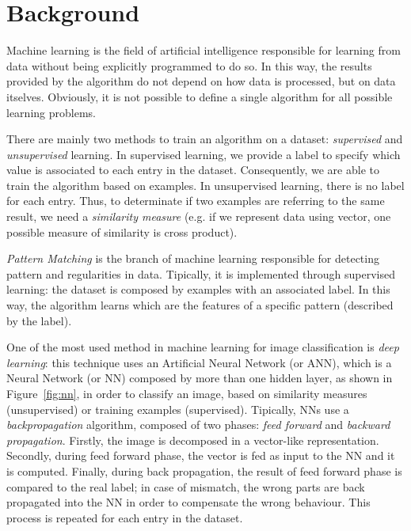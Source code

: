 \section{Background}
\label{sec:background}

Machine learning is the field of artificial intelligence responsible for learning from data without being explicitly programmed to do so. In this way, the results provided by the algorithm do not depend on how data is processed, but on data itselves. Obviously, it is not possible to define a single algorithm for all possible learning problems.

There are mainly two methods to train an algorithm on a dataset: \textit{supervised} and \textit{unsupervised} learning. In supervised learning, we provide a label to specify which value is associated to each entry in the dataset. Consequently, we are able to train the algorithm based on examples. In unsupervised learning, there is no label for each entry. Thus, to determinate if two examples are referring to the same result, we need a \textit{similarity measure} (e.g. if we represent data using vector, one possible measure of similarity is cross product).

\textit{Pattern Matching} is the branch of machine learning responsible for detecting pattern and regularities in data. Tipically, it is implemented through supervised learning: the dataset is composed by examples with an associated label. In this way, the algorithm learns which are the features of a specific pattern (described by the label).

One of the most used method in machine learning for image classification is \textit{deep learning}: this technique uses an Artificial Neural Network (or ANN), which is a Neural Network (or NN) composed by more than one hidden layer, as shown in Figure~\ref{fig:nn}, in order to classify an image, based on similarity measures (unsupervised) or training examples (supervised). Tipically, NNs use a \textit{backpropagation} algorithm, composed of two phases: \textit{feed forward} and \textit{backward propagation}. Firstly, the image is decomposed in a vector-like representation. Secondly, during feed forward phase, the vector is fed as input to the NN and it is computed. Finally, during back propagation, the result of feed forward phase is compared to the real label; in case of mismatch, the wrong parts are back propagated into the NN in order to compensate the wrong behaviour. This process is repeated for each entry in the dataset.

